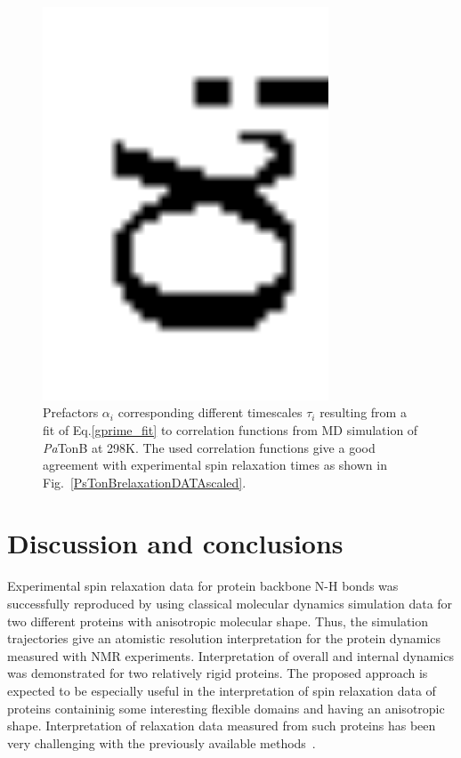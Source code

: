 \documentclass[pre,aps,floatfix,authordate1-4,twocolumn]{revtex4-1}
\begin{document}
\begin{figure}[!h]
  \includegraphics[width=8.5cm]{../Figs/coeffsPLOT.eps}%
  \caption{Prefactors $\alpha_i$ corresponding different timescales $\tau_i$
    resulting from a fit of Eq.\ref{gprime_fit} to correlation functions from
    MD simulation of {\it Pa}TonB at 298K. The used correlation functions give
    a good agreement with experimental spin relaxation times as shown in
    Fig.~\ref{PsTonBrelaxationDATAscaled}.  \label{coeffsPLOT}}%
\end{figure}



\section{Discussion and conclusions}
Experimental spin relaxation data for protein backbone N-H bonds
was successfully reproduced by using classical molecular dynamics
simulation data for two different proteins with anisotropic molecular
shape. Thus, the simulation trajectories give an atomistic resolution
interpretation for the protein dynamics measured with NMR experiments.
Interpretation of overall and internal dynamics was demonstrated for
two relatively rigid proteins. The proposed approach is expected
to be especially useful in the interpretation of spin relaxation data
of proteins containinig some interesting flexible domains and having
an anisotropic shape. Interpretation of relaxation data measured from
such proteins has been very challenging with the previously available
methods~\cite{barbato92}.
\end{document}
